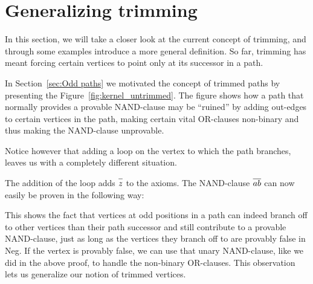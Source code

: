 

\section{Generalizing trimming}
\label{sec:Generalizing trimming}
In this section, we will take a closer look at the current concept of trimming, and through some examples introduce a more general definition.
So far, trimming has meant forcing certain vertices to point only at its successor in a path.

In Section~\ref{sec:Odd paths} we motivated the concept of trimmed paths by presenting the Figure~\ref{fig:kernel_untrimmed}.
The figure shows how a path that normally provides a provable NAND-clause may be ``ruined'' by adding out-edges to certain vertices in the path, making certain vital OR-clauses non-binary and thus making the NAND-clause unprovable.

Notice however that adding a loop on the vertex to which the path branches, leaves us with a completely different situation.\par
\begin{figure}[!h]
  \centering
  \caption{}
  \label{fig:path_3_with_loop}
\end{figure}
The addition of the loop adds $\ol{z}$ to the axioms.
The NAND-clause $\ol{ab}$ can now easily be proven in the following way:\par
\begin{figure}[!h]
  \centering
  \begin{prooftree*}
  \end{prooftree*}
  \caption{}
  \label{fig:proof_loop}
\end{figure}
This shows the fact that vertices at odd positions in a path can indeed branch off to other vertices than their path successor and still contribute to a provable NAND-clause, just as long as the vertices they branch off to are provably false in Neg.
If the vertex is provably false, we can use that unary NAND-clause, like we did in the above proof, to handle the non-binary OR-clauses.
This observation lets us generalize our notion of trimmed vertices.

